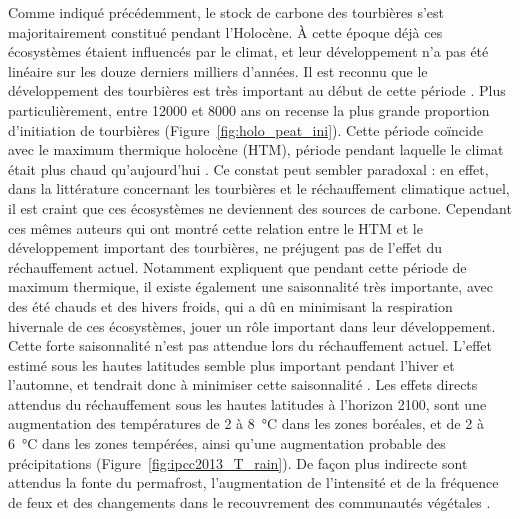Comme indiqué précédemment, le stock de carbone des tourbières s'est majoritairement constitué pendant l'Holocène.
À cette époque déjà ces écosystèmes étaient influencés par le climat, et leur développement n'a pas été linéaire sur les douze derniers milliers d'années.
Il est reconnu que le développement des tourbières est très important au début de cette période \citep{smith2004,macdonald2006,yu2009}.
Plus particulièrement, entre \num{12000} et \num{8000} ans on recense la plus grande proportion d'initiation de tourbières (Figure~\ref{fig:holo_peat_ini}).
Cette période coïncide avec le maximum thermique holocène (HTM), période pendant laquelle le climat était plus chaud qu'aujourd’hui \citep{kaufman2004}.
Ce constat peut sembler paradoxal : en effet, dans la littérature concernant les tourbières et le réchauffement climatique actuel, il est craint que ces écosystèmes ne deviennent des sources de carbone.
Cependant ces mêmes auteurs qui ont montré cette relation entre le HTM et le développement important des tourbières, ne préjugent pas de l'effet du réchauffement actuel.
Notamment \citet{jones2010} expliquent que pendant cette période de maximum thermique, il existe également une saisonnalité très importante, avec des été chauds et des hivers froids, qui a dû en minimisant la respiration hivernale de ces écosystèmes, jouer un rôle important dans leur développement.
Cette forte saisonnalité n'est pas attendue lors du réchauffement actuel.
L'effet estimé sous les hautes latitudes semble plus important pendant l'hiver et l'automne, et tendrait donc à minimiser cette saisonnalité \citep{christensen2007}.
Les effets directs attendus du réchauffement sous les hautes latitudes à l'horizon 2100, sont une augmentation des températures de 2 à \SI{8}{\degreeCelsius} dans les zones boréales, et de 2 à \SI{6}{\degreeCelsius} dans les zones tempérées, ainsi  qu'une augmentation probable des précipitations (Figure~\ref{fig:ipcc2013_T_rain}).
De façon plus indirecte sont attendus la fonte du permafrost, l'augmentation de l'intensité et de la fréquence de feux et des changements dans le recouvrement des communautés végétales \citep{christensen2013,frolking2011}.

